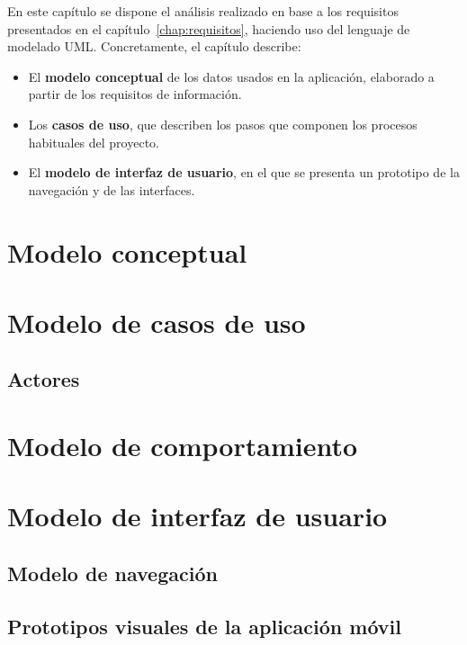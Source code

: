 En este capítulo se dispone el análisis realizado en base a los requisitos
presentados en el capítulo~\ref{chap:requisitos}, haciendo uso del lenguaje de
modelado UML. Concretamente, el capítulo describe:

\begin{itemize}
\item El \textbf{modelo conceptual} de los datos usados en la aplicación,
  elaborado a partir de los requisitos de información.
\item Los \textbf{casos de uso}, que describen los pasos que componen los
  procesos habituales del proyecto.
\item El \textbf{modelo de interfaz de usuario}, en el que se presenta un
  prototipo de la navegación y de las interfaces.
\end{itemize}

\section{Modelo conceptual}


\section{Modelo de casos de uso}


\subsection{Actores}


\section{Modelo de comportamiento}

\section{Modelo de interfaz de usuario}

\subsection{Modelo de navegación}

\subsection{Prototipos visuales de la aplicación móvil}
